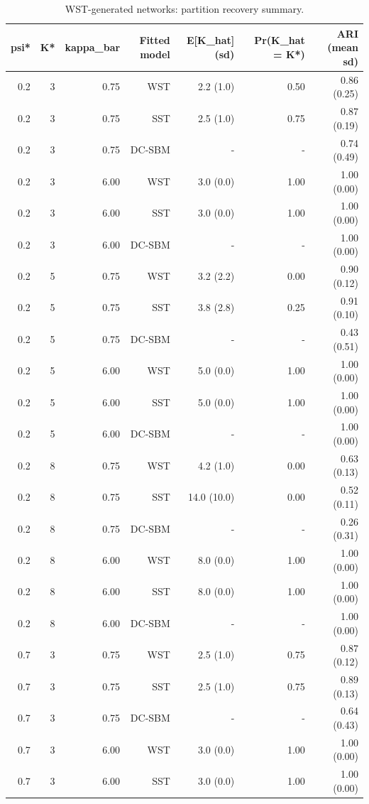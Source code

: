 \begin{table}[!h]
\centering
\caption{WST-generated networks: partition recovery summary.\\\label{tab:part-wst-full-simulation-crossfit-final-DemoKvar-run-20260224-155823}}
\centering
\begin{tabular}[t]{rrrrrrr}
\toprule
psi* & K* & kappa_bar & Fitted model & E[K_hat] (sd) & Pr(K_hat = K*) & ARI (mean sd)\\
\midrule
0.2 & 3 & 0.75 & WST & 2.2 (1.0) & 0.50 & 0.86 (0.25)\\
0.2 & 3 & 0.75 & SST & 2.5 (1.0) & 0.75 & 0.87 (0.19)\\
0.2 & 3 & 0.75 & DC-SBM & - & - & 0.74 (0.49)\\
0.2 & 3 & 6.00 & WST & 3.0 (0.0) & 1.00 & 1.00 (0.00)\\
0.2 & 3 & 6.00 & SST & 3.0 (0.0) & 1.00 & 1.00 (0.00)\\
0.2 & 3 & 6.00 & DC-SBM & - & - & 1.00 (0.00)\\
0.2 & 5 & 0.75 & WST & 3.2 (2.2) & 0.00 & 0.90 (0.12)\\
0.2 & 5 & 0.75 & SST & 3.8 (2.8) & 0.25 & 0.91 (0.10)\\
0.2 & 5 & 0.75 & DC-SBM & - & - & 0.43 (0.51)\\
0.2 & 5 & 6.00 & WST & 5.0 (0.0) & 1.00 & 1.00 (0.00)\\
0.2 & 5 & 6.00 & SST & 5.0 (0.0) & 1.00 & 1.00 (0.00)\\
0.2 & 5 & 6.00 & DC-SBM & - & - & 1.00 (0.00)\\
0.2 & 8 & 0.75 & WST & 4.2 (1.0) & 0.00 & 0.63 (0.13)\\
0.2 & 8 & 0.75 & SST & 14.0 (10.0) & 0.00 & 0.52 (0.11)\\
0.2 & 8 & 0.75 & DC-SBM & - & - & 0.26 (0.31)\\
0.2 & 8 & 6.00 & WST & 8.0 (0.0) & 1.00 & 1.00 (0.00)\\
0.2 & 8 & 6.00 & SST & 8.0 (0.0) & 1.00 & 1.00 (0.00)\\
0.2 & 8 & 6.00 & DC-SBM & - & - & 1.00 (0.00)\\
0.7 & 3 & 0.75 & WST & 2.5 (1.0) & 0.75 & 0.87 (0.12)\\
0.7 & 3 & 0.75 & SST & 2.5 (1.0) & 0.75 & 0.89 (0.13)\\
0.7 & 3 & 0.75 & DC-SBM & - & - & 0.64 (0.43)\\
0.7 & 3 & 6.00 & WST & 3.0 (0.0) & 1.00 & 1.00 (0.00)\\
0.7 & 3 & 6.00 & SST & 3.0 (0.0) & 1.00 & 1.00 (0.00)\\

\end{tabular}
\end{table}
